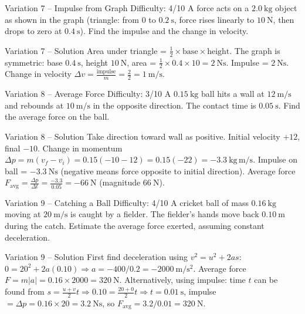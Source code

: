 \documentclass[11pt]{beamer}
\begin{document}
\begin{frame}[shrink=15]{Variation 7 – Impulse from Graph \hfill Difficulty: 4/10}
A force acts on a $2.0\ \mathrm{kg}$ object as shown in the graph (triangle: from $0$ to $0.2\ \mathrm{s}$, force rises linearly to $10\ \mathrm{N}$, then drops to zero at $0.4\ \mathrm{s}$). Find the impulse and the change in velocity.
\end{frame}

\begin{frame}{Variation 7 – Solution}
Area under triangle = $\frac12 \times \text{base} \times \text{height}$. The graph is symmetric: base $0.4\ \mathrm{s}$, height $10\ \mathrm{N}$, area = $\frac12 \times 0.4 \times 10 = 2\ \mathrm{Ns}$.
Impulse = $2\ \mathrm{Ns}$. Change in velocity $\Delta v = \frac{\text{impulse}}{m} = \frac{2}{2} = 1\ \mathrm{m/s}$.
\end{frame}

\begin{frame}[shrink=15]{Variation 8 – Average Force \hfill Difficulty: 3/10}
A $0.15\ \mathrm{kg}$ ball hits a wall at $12\ \mathrm{m/s}$ and rebounds at $10\ \mathrm{m/s}$ in the opposite direction. The contact time is $0.05\ \mathrm{s}$. Find the average force on the ball.
\end{frame}

\begin{frame}{Variation 8 – Solution}
Take direction toward wall as positive. Initial velocity $+12$, final $-10$.
Change in momentum $\Delta p = m(v_f - v_i) = 0.15(-10 - 12) = 0.15(-22) = -3.3\ \mathrm{kg\,m/s}$.
Impulse on ball = $-3.3\ \mathrm{Ns}$ (negative means force opposite to initial direction).
Average force $F_{\text{avg}} = \frac{\Delta p}{\Delta t} = \frac{-3.3}{0.05} = -66\ \mathrm{N}$ (magnitude $66\ \mathrm{N}$).
\end{frame}

\begin{frame}[shrink=15]{Variation 9 – Catching a Ball \hfill Difficulty: 4/10}
A cricket ball of mass $0.16\ \mathrm{kg}$ moving at $20\ \mathrm{m/s}$ is caught by a fielder. The fielder's hands move back $0.10\ \mathrm{m}$ during the catch. Estimate the average force exerted, assuming constant deceleration.
\end{frame}

\begin{frame}{Variation 9 – Solution}
First find deceleration using $v^2 = u^2 + 2a s$: $0 = 20^2 + 2a(0.10) \Rightarrow a = -400/0.2 = -2000\ \mathrm{m/s^2}$.
Average force $F = m|a| = 0.16\times2000 = 320\ \mathrm{N}$.
Alternatively, using impulse: time $t$ can be found from $s = \frac{u+v}{2}t \Rightarrow 0.10 = \frac{20+0}{2}t \Rightarrow t = 0.01\ \mathrm{s}$, impulse $= \Delta p = 0.16\times20 = 3.2\ \mathrm{Ns}$, so $F_{\text{avg}} = 3.2/0.01 = 320\ \mathrm{N}$.
\end{frame}
\end{document}
